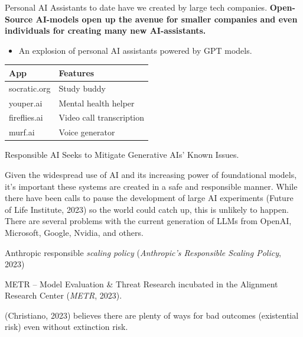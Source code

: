 \documentclass[
  letterpaper,
  DIV=11,
  numbers=noendperiod]{scrartcl}
\providecommand{\tightlist}{%
  \setlength{\itemsep}{0pt}\setlength{\parskip}{0pt}}\usepackage{longtable,booktabs,array}
\begin{document}
Personal AI Assistants to date have we created by large tech companies.
\textbf{Open-Source AI-models open up the avenue for smaller companies
and even individuals for creating many new AI-assistants.}

\begin{itemize}
\tightlist
\item
  An explosion of personal AI assistants powered by GPT models.
\end{itemize}

\begin{longtable}[]{@{}ll@{}}
\toprule\noalign{}
App & Features \\
\midrule\noalign{}
\endhead
\bottomrule\noalign{}
\endlastfoot
socratic.org & Study buddy \\
youper.ai & Mental health helper \\
fireflies.ai & Video call transcription \\
murf.ai & Voice generator \\
\end{longtable}

Responsible AI Seeks to Mitigate Generative AIs' Known Issues.

Given the widespread use of AI and its increasing power of foundational
models, it's important these systems are created in a safe and
responsible manner. While there have been calls to pause the development
of large AI experiments (Future of Life Institute, 2023) so the world
could catch up, this is unlikely to happen. There are several problems
with the current generation of LLMs from OpenAI, Microsoft, Google,
Nvidia, and others.

Anthropic responsible \emph{scaling policy} (\emph{Anthropic's
{Responsible Scaling Policy}}, 2023)

METR -- Model Evaluation \& Threat Research incubated in the Alignment
Research Center (\emph{{METR}}, 2023).

(Christiano, 2023) believes there are plenty of ways for bad outcomes
(existential risk) even without extinction risk.
\end{document}
